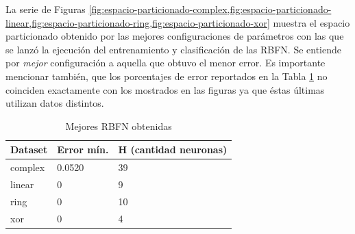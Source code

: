 \documentclass[journal]{IEEEtran}
\begin{document}
La serie de Figuras \cref{fig:espacio-particionado-complex,fig:espacio-particionado-linear,fig:espacio-particionado-ring,fig:espacio-particionado-xor} muestra el espacio particionado obtenido por las mejores configuraciones de parámetros con las que se lanzó la ejecución del entrenamiento y clasificación de las RBFN.
Se entiende por \emph{mejor} configuración a aquella que obtuvo el menor error.
Es importante mencionar también, que los porcentajes de error reportados en la Tabla \ref{tab:best-rna} no coinciden exactamente con los mostrados en las figuras ya que éstas últimas utilizan datos distintos.

\begin{table}[h]
\centering
\begin{tabular}{@{}lll@{}}
\toprule
\multicolumn{1}{c}{\textbf{Dataset}} & \multicolumn{1}{c}{\textbf{Error mín.}} & \multicolumn{1}{c}{\textbf{H (cantidad neuronas)}} \\ \midrule
complex                              & 0.0520                                  & 39                                                 \\
linear                               & 0                                       & 9                                                  \\
ring                                 & 0                                       & 10                                                 \\
xor                                  & 0                                       & 4                                                  \\ \bottomrule
\end{tabular}
\caption{Mejores RBFN obtenidas}
\label{tab:best-rna}
\end{table}
\end{document}
